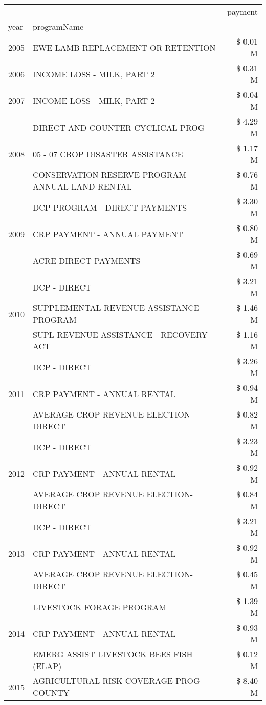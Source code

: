 \begin{tabular}{llr}
\toprule
 &  & payment \\
year & programName &  \\
\midrule
2005 & EWE LAMB REPLACEMENT OR RETENTION & \$ 0.01 M \\
\cline{1-3}
2006 & INCOME LOSS - MILK, PART 2 & \$ 0.31 M \\
\cline{1-3}
2007 & INCOME LOSS - MILK, PART 2 & \$ 0.04 M \\
\cline{1-3}
\multirow[t]{3}{*}{2008} & DIRECT AND COUNTER CYCLICAL PROG & \$ 4.29 M \\
 & 05 - 07 CROP DISASTER ASSISTANCE & \$ 1.17 M \\
 & CONSERVATION RESERVE PROGRAM - ANNUAL LAND RENTAL & \$ 0.76 M \\
\cline{1-3}
\multirow[t]{3}{*}{2009} & DCP PROGRAM - DIRECT PAYMENTS & \$ 3.30 M \\
 & CRP PAYMENT - ANNUAL PAYMENT & \$ 0.80 M \\
 & ACRE DIRECT PAYMENTS & \$ 0.69 M \\
\cline{1-3}
\multirow[t]{3}{*}{2010} & DCP - DIRECT & \$ 3.21 M \\
 & SUPPLEMENTAL REVENUE ASSISTANCE PROGRAM & \$ 1.46 M \\
 & SUPL REVENUE ASSISTANCE - RECOVERY ACT & \$ 1.16 M \\
\cline{1-3}
\multirow[t]{3}{*}{2011} & DCP - DIRECT & \$ 3.26 M \\
 & CRP PAYMENT - ANNUAL RENTAL & \$ 0.94 M \\
 & AVERAGE CROP REVENUE ELECTION-DIRECT & \$ 0.82 M \\
\cline{1-3}
\multirow[t]{3}{*}{2012} & DCP - DIRECT & \$ 3.23 M \\
 & CRP PAYMENT - ANNUAL RENTAL & \$ 0.92 M \\
 & AVERAGE CROP REVENUE ELECTION-DIRECT & \$ 0.84 M \\
\cline{1-3}
\multirow[t]{3}{*}{2013} & DCP - DIRECT & \$ 3.21 M \\
 & CRP PAYMENT - ANNUAL RENTAL & \$ 0.92 M \\
 & AVERAGE CROP REVENUE ELECTION-DIRECT & \$ 0.45 M \\
\cline{1-3}
\multirow[t]{3}{*}{2014} & LIVESTOCK FORAGE PROGRAM & \$ 1.39 M \\
 & CRP PAYMENT - ANNUAL RENTAL & \$ 0.93 M \\
 & EMERG ASSIST LIVESTOCK BEES FISH (ELAP) & \$ 0.12 M \\
\cline{1-3}
\multirow[t]{3}{*}{2015} & AGRICULTURAL RISK COVERAGE PROG - COUNTY & \$ 8.40 M \\

\end{tabular}
